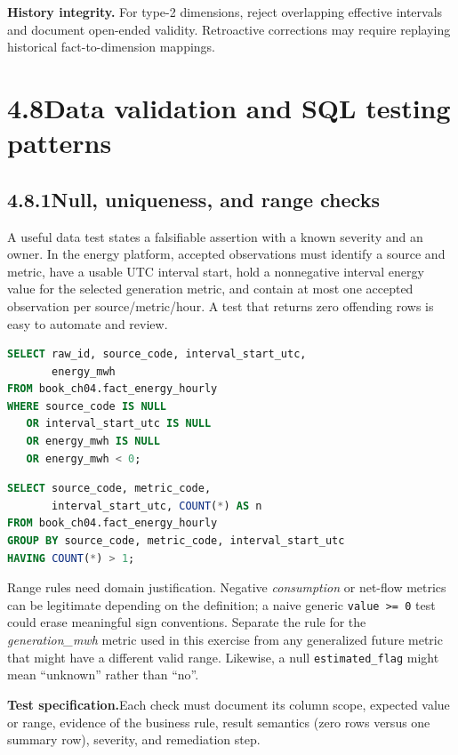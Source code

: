 \documentclass[11pt,twoside]{article}
\newcommand{\topic}[2]{\subsection*{#1\quad #2}}
\begin{document}
\textbf{History integrity.} For type-2 dimensions, reject overlapping effective intervals and document open-ended validity. Retroactive corrections may require replaying historical fact-to-dimension mappings.

\newpage
\section*{4.8\quad Data validation and SQL testing patterns}
\topic{4.8.1}{Null, uniqueness, and range checks}
A useful data test states a falsifiable assertion with a known severity and an owner. In the energy platform, accepted observations must identify a source and metric, have a usable UTC interval start, hold a nonnegative interval energy value for the selected generation metric, and contain at most one accepted observation per source/metric/hour. A test that returns zero offending rows is easy to automate and review.

\begin{lstlisting}[language=SQL,caption={Failing rows: missing or negative accepted energy.}]
SELECT raw_id, source_code, interval_start_utc,
       energy_mwh
FROM book_ch04.fact_energy_hourly
WHERE source_code IS NULL
   OR interval_start_utc IS NULL
   OR energy_mwh IS NULL
   OR energy_mwh < 0;
\end{lstlisting}
\begin{lstlisting}[language=SQL,caption={Failing keys: more than one fact per grain.}]
SELECT source_code, metric_code,
       interval_start_utc, COUNT(*) AS n
FROM book_ch04.fact_energy_hourly
GROUP BY source_code, metric_code, interval_start_utc
HAVING COUNT(*) > 1;
\end{lstlisting}

Range rules need domain justification. Negative \emph{consumption} or net-flow metrics can be legitimate depending on the definition; a naive generic \texttt{value >= 0} test could erase meaningful sign conventions. Separate the rule for the \emph{generation\_mwh} metric used in this exercise from any generalized future metric that might have a different valid range. Likewise, a null \texttt{estimated\_flag} might mean ``unknown'' rather than ``no''.

\begin{whitebox}\textbf{Test specification.}\quad Each check must document its column scope, expected value or range, evidence of the business rule, result semantics (zero rows versus one summary row), severity, and remediation step.\end{whitebox}
\end{document}
